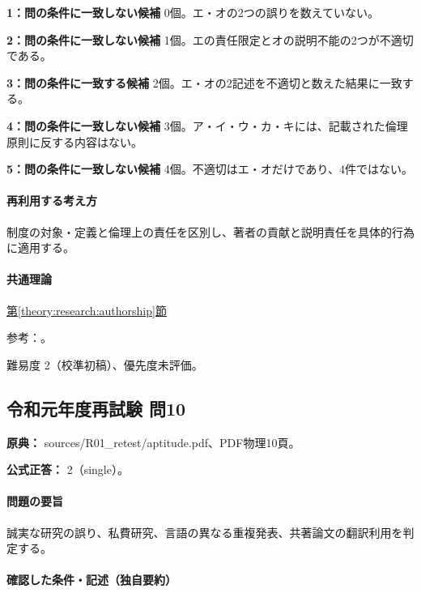 \noindent\textbf{1：問の条件に一致しない候補} 0個。エ・オの2つの誤りを数えていない。\par

\noindent\textbf{2：問の条件に一致しない候補} 1個。エの責任限定とオの説明不能の2つが不適切である。\par

\noindent\textbf{3：問の条件に一致する候補} 2個。エ・オの2記述を不適切と数えた結果に一致する。\par

\noindent\textbf{4：問の条件に一致しない候補} 3個。ア・イ・ウ・カ・キには、記載された倫理原則に反する内容はない。\par

\noindent\textbf{5：問の条件に一致しない候補} 4個。不適切はエ・オだけであり、4件ではない。\par

\paragraph{再利用する考え方} 制度の対象・定義と倫理上の責任を区別し、著者の貢献と説明責任を具体的行為に適用する。

\paragraph{共通理論} \hyperref[theory:research:authorship]{第\ref*{theory:research:authorship}節}

\par 参考：\cite{jsps_integrity2025}。

\par 難易度 2（校準初稿）、優先度未評価。

\subsection{令和元年度再試験 問10}
\label{q:r01-ret-apt-10}

\noindent\textbf{原典：} sources/R01\_retest/aptitude.pdf、PDF物理10頁。

\textbf{公式正答：} 2（single）。

\paragraph{問題の要旨} 誠実な研究の誤り、私費研究、言語の異なる重複発表、共著論文の翻訳利用を判定する。

\paragraph{確認した条件・記述（独自要約）}\mbox{}\par

